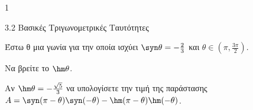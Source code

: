 \begin{ylh}{1}
\item 3.2 Βασικές Τριγωνομετρικές Ταυτότητες
\end{ylh}
Έστω θ μια γωνία για την οποία ισχύει $\syn \theta = -\frac{2}{3}$ και $\theta \in \left(\pi, \frac{3\pi}{2}\right)$.
\begin{alist}
\item Να βρείτε το $\hm \theta$.
\item Αν $\hm \theta = -\frac{\sqrt{5}}{3}$ να υπολογίσετε την τιμή της παράστασης
$A = \syn (\pi - \theta)\syn (-\theta) - \hm (\pi - \theta)\hm (-\theta)$.
\end{alist}

